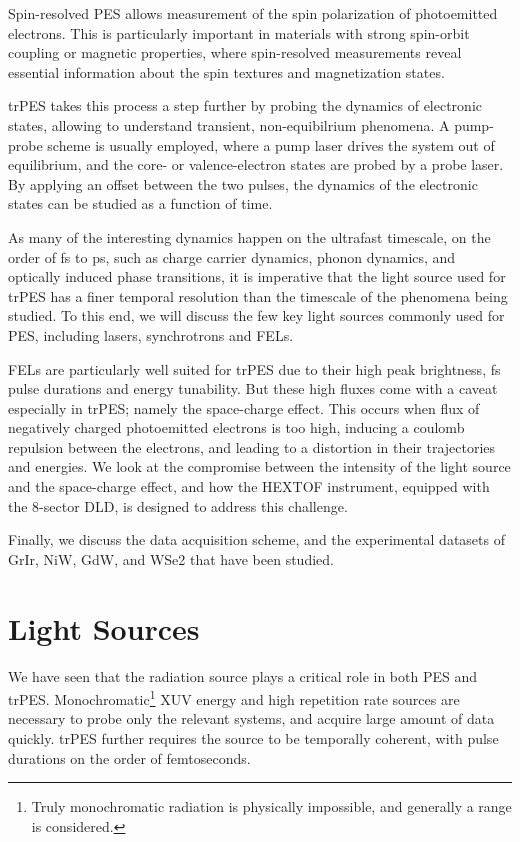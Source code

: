 Spin-resolved \gls{PES} allows measurement of the spin polarization of photoemitted electrons. This is particularly important in materials with strong spin-orbit coupling or magnetic properties, where spin-resolved measurements reveal essential information about the spin textures and magnetization states.

\Gls{trPES} takes this process a step further by probing the dynamics of electronic states, allowing to understand transient, non-equibilrium phenomena. A pump-probe scheme is usually employed, where a pump laser drives the system out of equilibrium, and the core- or valence-electron states are probed by a probe laser. By applying an offset between the two pulses, the dynamics of the electronic states can be studied as a function of time.

As many of the interesting dynamics happen on the ultrafast timescale, on the order of \unit{fs} to \unit{ps}, such as charge carrier dynamics, phonon dynamics, and optically induced phase transitions, it is imperative that the light source used for \gls{trPES} has a finer temporal resolution than the timescale of the phenomena being studied. To this end, we will discuss the few key light sources commonly used for \gls{PES}, including lasers, synchrotrons and \glspl{FEL}.

\Glspl{FEL} are particularly well suited for \gls{trPES} due to their high peak brightness, \unit{fs} pulse durations and energy tunability. But these high fluxes come with a caveat especially in \gls{trPES}; namely the space-charge effect. This occurs when flux of negatively charged photoemitted electrons is too high, inducing a coulomb repulsion between the electrons, and leading to a distortion in their trajectories and energies. We look at the compromise between the intensity of the light source and the space-charge effect, and how the \gls{HEXTOF} instrument, equipped with the \num{8}-sector \gls{DLD}, is designed to address this challenge.

Finally, we discuss the data acquisition scheme, and the experimental datasets of \gls{GrIr}, \gls{NiW}, \gls{GdW}, and \gls{WSe2} that have been studied.

\section{Light Sources}\label{section:light-sources}
We have seen that the radiation source plays a critical role in both \gls{PES} and \gls{trPES}. Monochromatic\footnote{Truly monochromatic radiation is physically impossible, and generally a range is considered.} \gls{XUV} energy and high repetition rate sources are necessary to probe only the relevant systems, and acquire large amount of data quickly. \Gls{trPES} further requires the source to be temporally coherent, with pulse durations on the order of femtoseconds.


